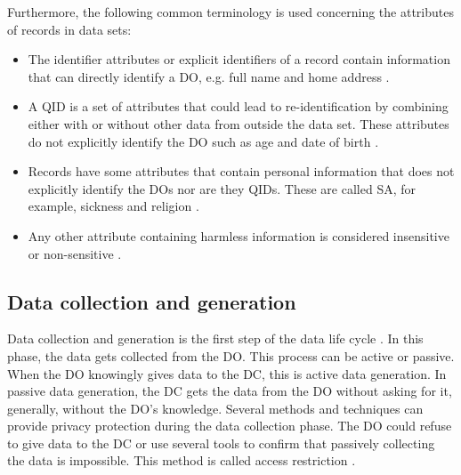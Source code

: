 Furthermore, the following common terminology is used concerning the attributes of records in data sets:

\begin{itemize}

    \item
        The identifier attributes or explicit identifiers of a record contain information that can directly identify a \gls{DO}, e.g. full name and home address 
        \cite{Jain2016,Kundeti2018,Fung2010,Sweeney2002,Lu2021,Mendes2017}.

    \item 
        A \gls{QID} is a set of attributes that could lead to re-identification by combining either with or without other data from outside the data set.
        These attributes do not explicitly identify the \gls{DO} such as age and date of birth 
        \cite{Jain2016,Kundeti2018,Fung2010,Lu2021,Mendes2017}.

    \item
        Records have some attributes that contain personal information that does not explicitly identify the \gls{DO}s nor are they \gls{QID}s.
        These are called \gls{SA}, for example, sickness and religion \cite{Jain2016,Kundeti2018,Fung2010,Lu2021,Mendes2017}.

    \item
        Any other attribute containing harmless information is considered insensitive or non-sensitive \cite{Jain2016, Kundeti2018,Fung2010, Lu2021, Mendes2017}.
    
\end{itemize}


\subsection{Data collection and generation}
\label{s:DataCollectionGeneration}


Data collection and generation is the first step of the data life cycle \cite{Mendes2017, Mehmood2016}.
In this phase, the data gets collected from the \gls{DO}.
This process can be active or passive. 
When the \gls{DO} knowingly gives data to the \gls{DC}, this is active data generation.
In passive data generation, the \gls{DC} gets the data from the \gls{DO} without asking for it, generally, without the \gls{DO}'s knowledge.
Several methods and techniques can provide privacy protection during the data collection phase. 
The \gls{DO} could refuse to give data to the \gls{DC} or use several tools to confirm that passively collecting the data is impossible.
This method is called access restriction \cite{Jain2016}. 

